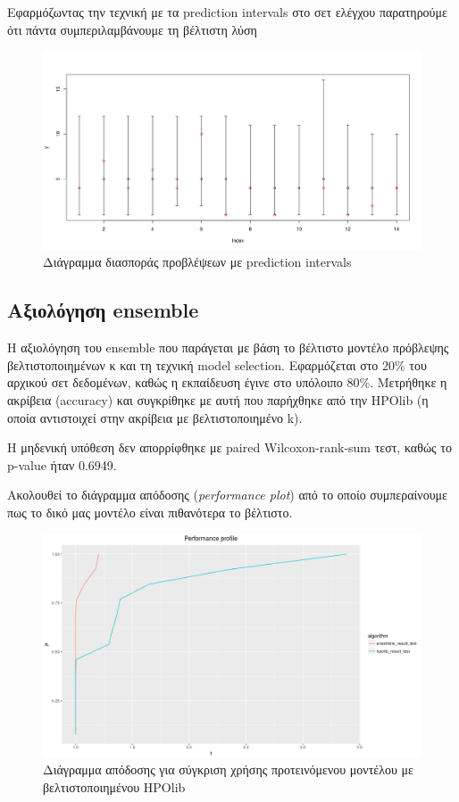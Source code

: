 \documentclass[]{article}
\numberwithin{equation}{section}		%
\numberwithin{figure}{section}			%
\numberwithin{table}{section}				%
\begin{document}
   Εφαρμόζωντας την τεχνική με τα prediction intervals στο σετ ελέγχου παρατηρούμε ότι πάντα συμπεριλαμβάνουμε τη βέλτιστη λύση
   	\begin{figure}
   		\centering
   		\includegraphics[width=\linewidth, height=0.15\textheight]{lm_trans_pred_int}
   		\caption{Διάγραμμα διασποράς προβλέψεων με prediction intervals }
   		\label{fig:1}
   	\end{figure}%
   	
   	\subsection{Αξιολόγηση ensemble}   	
   	H αξιολόγηση του ensemble που παράγεται με βάση το βέλτιστο μοντέλο πρόβλεψης βελτιστοποιημένων κ και τη τεχνική model selection. Εφαρμόζεται στο $20\%$ του αρχικού σετ δεδομένων, καθώς η εκπαίδευση έγινε στο υπόλοιπο $80\%$. Μετρήθηκε η ακρίβεια (accuracy) και συγκρίθηκε με αυτή που παρήχθηκε από την HPOlib (η οποία αντιστοιχεί στην ακρίβεια με βελτιστοποιημένο k).
   	
   	Η μηδενική υπόθεση δεν απορρίφθηκε με  paired Wilcoxon-rank-sum τεστ, καθώς το p-value ήταν 0.6949. 
   	
   	Ακολουθεί το διάγραμμα απόδοσης (\textit{performance plot}) \citep{Dolan2002} από το οποίο συμπεραίνουμε πως το δικό μας μοντέλο είναι πιθανότερα το βέλτιστο. 
   	
   	\begin{figure}[H]
   		\centering
   		\includegraphics[width=\linewidth, height=0.3\textheight]{perf_prof}
   		\caption{Διάγραμμα απόδοσης για σύγκριση χρήσης προτεινόμενου μοντέλου με βελτιστοποιημένου HPOlib}
   		\label{fig:1}
   	\end{figure}%
   	
   	
    \printbibliography[title= Βιβλιογραφία]
\end{document}
